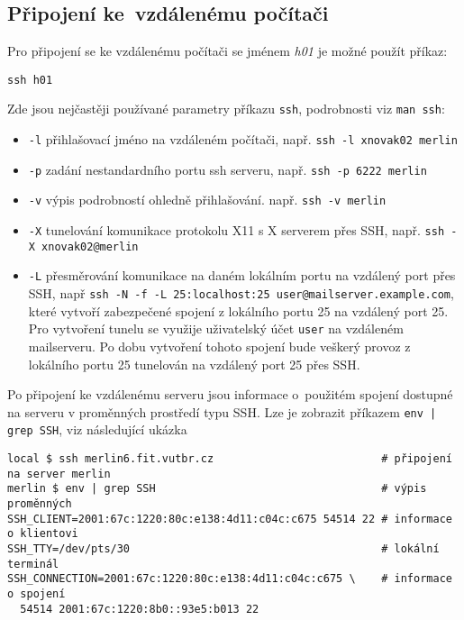 \subsection{Připojení ke~vzdálenému počítači}
Pro připojení se ke vzdálenému počítači se jménem \emph{h01} je možné použít příkaz:
\begin{verbatim}
ssh h01
\end{verbatim}
Zde jsou nejčastěji používané parametry příkazu {\tt ssh}, podrobnosti viz {\tt man ssh}:
\begin{itemize}
  \item {\tt -l} přihlašovací jméno na vzdáleném počítači, např. {\tt ssh -l xnovak02 merlin}
  \item {\tt -p} zadání nestandardního portu ssh serveru, např. {\tt ssh -p 6222 merlin}
  \item {\tt -v} výpis podrobností ohledně přihlašování. např. {\tt ssh -v merlin}
  \item {\tt -X} tunelování komunikace protokolu X11  s X serverem přes SSH, např. {\tt ssh -X xnovak02@merlin}
  \item {\tt -L} přesměrování komunikace na daném lokálním portu na vzdálený port přes SSH, např {\tt ssh -N -f -L 25:localhost:25 user@mailserver.example.com}, které vytvoří zabezpečené spojení z lokálního portu 25 na vzdálený port 25. Pro vytvoření tunelu se využije uživatelský účet {\tt user} na vzdáleném mailserveru. Po dobu vytvoření tohoto spojení bude veškerý provoz z lokálního portu 25 tunelován na vzdálený port 25 přes SSH. 
\end{itemize}
 
Po připojení ke vzdálenému serveru jsou informace o~použitém spojení dostupné na serveru v proměnných prostředí typu SSH.  Lze je zobrazit  příkazem {\tt env | grep SSH}, viz následující ukázka
\begin{verbatim}
local $ ssh merlin6.fit.vutbr.cz                          # připojení na server merlin
merlin $ env | grep SSH                                   # výpis proměnných
SSH_CLIENT=2001:67c:1220:80c:e138:4d11:c04c:c675 54514 22 # informace o klientovi
SSH_TTY=/dev/pts/30                                       # lokální terminál
SSH_CONNECTION=2001:67c:1220:80c:e138:4d11:c04c:c675 \    # informace o spojení
  54514 2001:67c:1220:8b0::93e5:b013 22
\end{verbatim}

